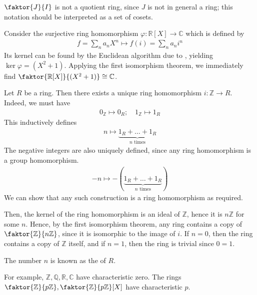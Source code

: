 \begin{remark}
	$\faktor{J}{I}$ is not a quotient ring, since $J$ is not in general a ring; this notation should be interpreted as a set of cosets.
\end{remark}

\begin{example}
	Consider the surjective ring homomorphism $\varphi \colon \mathbb R[X] \to \mathbb C$ which is defined by
	\begin{align*}
		f = \sum_n a_n X^n \mapsto f(i) = \sum_n a_n i^n
	\end{align*}
	Its kernel can be found by the Euclidean algorithm due to , yielding $\ker \varphi = (X^2 + 1)$.
	Applying the first isomorphism theorem, we immediately find $\faktor{\mathbb R[X]}{(X^2 + 1)} \cong \mathbb C$.
\end{example}

\begin{example}
	Let $R$ be a ring.
	Then there exists a unique ring homomorphism $i \colon \mathbb Z \to R$.
	Indeed, we must have
	\begin{align*}
		0_{\mathbb Z} \mapsto 0_R;\quad 1_{\mathbb Z} \mapsto 1_R
	\end{align*}
	This inductively defines
	\begin{align*}
		n \mapsto \underbrace{1_R + \dots + 1_R}_{n \text{ times}}
	\end{align*}
	The negative integers are also uniquely defined, since any ring homomorphism is a group homomorphism.
	\begin{align*}
		-n \mapsto -(\underbrace{1_R + \dots + 1_R}_{n \text{ times}})
	\end{align*}
	We can show that any such construction is a ring homomorphism as required.

	Then, the kernel of the ring homomorphism is an ideal of $\mathbb Z$, hence it is $n\mathbb Z$ for some $n$.
	Hence, by the first isomorphism theorem, any ring contains a copy of $\faktor{\mathbb Z}{n\mathbb Z}$, since it is isomorphic to the image of $i$.
	If $n = 0$, then the ring contains a copy of $\mathbb Z$ itself, and if $n = 1$, then the ring is trivial since $0 = 1$.
\end{example}

\begin{definition}[Characteristic]
	The number $n$ is known as the  of $R$.
\end{definition} 

\begin{example}
	For example, $\mathbb Z, \mathbb Q, \mathbb R, \mathbb C$ have characteristic zero.
	The rings $\faktor{\mathbb Z}{p \mathbb Z}, \faktor{\mathbb Z}{p \mathbb Z}[X]$ have characteristic $p$.
\end{example} 

